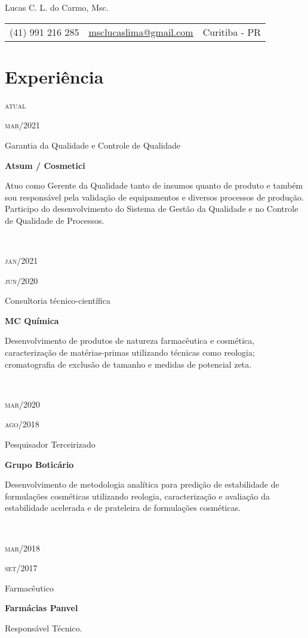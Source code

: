 \documentclass[a4paper, 11pt]{article}
\newcommand{\entry}[5]{
	\begin{minipage}[t]{.1\textwidth}
		\begin{flushright}
			\hfill
			{\textsc{#1}}

			{\textsc{#2}}
		\end{flushright}
	\end{minipage}
	\hfill\textcolor{Sepia}{\vline}\hfill
	\begin{minipage}[t]{.825\textwidth}

		#3
		
		\textcolor{Sepia}{\textbf{#4}}
		
		\footnotesize{#5}

	\end{minipage} \\ 
	\vspace{.5cm}

}
\begin{document}

\pagestyle{fancy} %
\fancyhf{} 
\renewcommand{\headrulewidth}{0pt}


\thispagestyle{empty}

\begin{center}
	
	{\LARGE Lucas C. L. do Carmo, Msc.}
	
	\vspace{6pt}
	\begin{tabular}{c|c|c}
		(41) 991 216 285 & \textcolor{Sepia}{\underline{\href{mailto:msclucaslima@gmail.com}{msclucaslima@gmail.com}}} & Curitiba - PR
	\end{tabular}
		
	
	\vspace{6pt}
	
\end{center}
	

\section{Experiência}

\entry{atual}{mar/2021}
{Garantia da Qualidade e Controle de Qualidade}
{Atsum / Cosmetici }
{Atuo como Gerente da Qualidade tanto de insumos quanto de produto e também sou responsável pela
validação de equipamentos e diversos processos de produção.
Participo do desenvolvimento do Sistema de Gestão da Qualidade e no Controle de Qualidade de Processos.}

\entry{jan/2021}{jun/2020}
{Consultoria técnico-científica}
{MC Química}
{Desenvolvimento de produtos de natureza farmacêutica e cosmética, 
caracterização de matérias-primas utilizando técnicas como reologia;
cromatografia de exclusão de tamanho e medidas de potencial zeta.}

\entry{mar/2020}{ago/2018}
{Pesquisador Terceirizado}
{Grupo Boticário}
{Desenvolvimento de metodologia analítica para predição de estabilidade
de formulações cosméticas utilizando reologia,
caracterização e avaliação da estabilidade acelerada e de prateleira
de formulações cosméticas.}

\entry{mar/2018}{set/2017}
{Farmacêutico}
{Farmácias Panvel}
{Responsável Técnico.}
\end{document}
